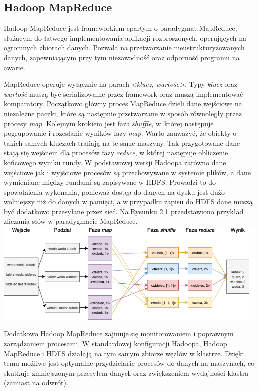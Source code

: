 \documentclass[magisterska]{pracamgr}
\begin{document}
\subsection{Hadoop MapReduce} \label{Hadoop MapReduce}

Hadoop MapReduce jest frameworkiem opartym o paradygmat MapReduce, służącym do łatwego implementowania aplikacji rozproszonych, operujących na ogromnych zbiorach danych. Pozwala na przetwarzanie nieustrukturyzowanych danych, zapewniającym przy tym niezawodność oraz odporność programu na awarie. 

MapReduce operuje wyłącznie na parach \textit{<klucz, wartość>}. Typy \textit{klucz} oraz \textit{wartość} muszą być serializowalne przez framework oraz muszą implementować komparatory. Początkowo główny proces MapReduce dzieli dane wejściowe na niezależne paczki, które są następnie przetwarzane w sposób równoległy przez procesy \textit{map}. Kolejnym krokiem jest faza \textit{shuffle}, w~której następuje pogrupowanie i rozesłanie wyników fazy \textit{map}. Warto zauważyć, że obiekty o takich samych kluczach trafiają na te same maszyny. Tak przygotowane dane stają się wejściem dla procesów fazy \textit{reduce}, w której następuje obliczenie końcowego wyniku rundy. W podstawowej wersji Hadoopa zarówno dane wejściowe jak i wyjściowe procesów są przechowywane w systemie plików, a dane wymieniane między rundami są zapisywane w HDFS. Prowadzi to do spowolnienia wykonania, ponieważ dostęp do danych na dysku jest dużo wolniejszy niż do danych w pamięci, a w przypadku zapisu do HDFS dane muszą być dodatkowo przesyłane przez sieć. Na Rysunku 2.1 przedstawiono przykład zliczania słów w paradygmacie MapReduce.\\

\includegraphics[width=14cm]{mapreduce_word_count.png}

Dodatkowo Hadoop MapReduce zajmuje się monitorowaniem i poprawnym zarządzaniem procesami. W standardowej konfiguracji Hadoopa, Hadoop MapReduce i HDFS działają na tym samym zbiorze węzłów w klastrze. Dzięki temu możliwe jest optymalne przydzielanie procesów do danych na maszynach, co skutkuje zmniejszonym przesyłem danych oraz zwiększeniem wydajności klastra (zamiast na odwrót).
\end{document}
